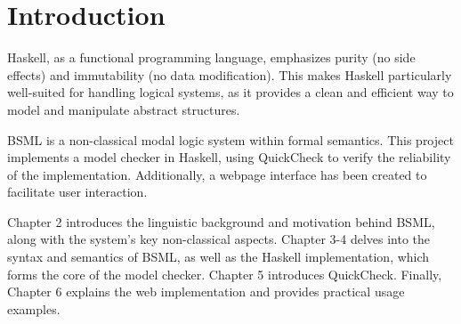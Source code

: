 
\section{Introduction}\label{sec:Introduction}

Haskell, as a functional programming language, 
emphasizes purity (no side effects) and immutability (no data modification). 
This makes Haskell particularly well-suited for handling logical systems, 
as it provides a clean and efficient way to model and manipulate abstract structures. 

BSML is a non-classical modal logic system within formal semantics. This project implements a model checker in Haskell, 
using QuickCheck to verify the reliability of the implementation. 
Additionally, a webpage interface has been created to facilitate user interaction. 

Chapter 2 introduces the linguistic background and motivation behind BSML, along with the system's key non-classical aspects. 
Chapter 3-4 delves into the syntax and semantics of BSML, as well as the Haskell implementation, which forms the core of the model checker. 
Chapter 5 introduces QuickCheck. 
Finally, Chapter 6 explains the web implementation and provides practical usage examples.